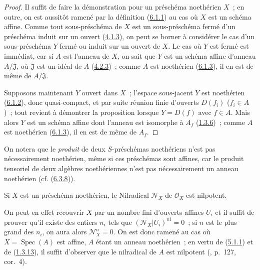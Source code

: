 \begin{proof}
Il suffit de faire la démonstration pour un préschéma noethérien $X$~; en
outre, on est aussitôt ramené par la définition
(\hyperref[I.6.1.1-fr]{6.1.1}) au cas où $X$ est un schéma affine. Comme tout
sous-préschéma de $X$ est un sous-préschéma fermé d'un préschéma induit sur
un ouvert (\hyperref[I.4.1.3-fr]{4.1.3}), on peut se borner à considérer le
cas d'un sous-préschéma $Y$ fermé ou induit sur un ouvert de $X$. Le cas où
$Y$ est fermé est immédiat, car si $A$ est l'anneau de $X$, on sait que $Y$
est un schéma affine d'anneau $A/\mathfrak{J}$, où $\mathfrak{J}$ est un
idéal de $A$ (\hyperref[I.4.2.3-fr]{4.2.3})~; comme $A$ est noethérien
(\hyperref[I.6.1.3-fr]{6.1.3}), il en est de même de $A/\mathfrak{J}$.

Supposons maintenant $Y$ ouvert dans $X$~; l'espace sous-jacent $Y$ est
noethérien (\hyperref[I.6.1.2-fr]{6.1.2}), donc quasi-compact, et par suite
réunion finie d'ouverts $D(f_i)$ ($f_i\in A$)~;
tout revient à démontrer la proposition lorsque $Y=D(f)$ avec $f\in A$. Mais
alors $Y$ est un schéma affine dont l'anneau est isomorphe à $A_f$
(\hyperref[I.1.3.6-fr]{1.3.6})~; comme $A$ est noethérien
(\hyperref[I.6.1.3-fr]{6.1.3}), il en est de même de $A_f$.
\end{proof}

\begin{env}[6.1.5]
\label{I.6.1.5-fr}
On notera que le \emph{produit} de deux $S$-préschémas noethériens n'est pas
nécessairement noethérien, même si ces préschémas sont affines, car le produit
tensoriel de deux algèbres noethériennes n'est pas nécessairement un anneau
noethérien (cf. (\hyperref[I.6.3.8-fr]{6.3.8})).
\end{env}

\begin{proposition}[6.1.6]
\label{I.6.1.6-fr}
Si $X$ est un préschéma noethérien, le Nilradical $\mathscr{N}_X$ de
$\mathscr{O}_X$ est nilpotent.
\end{proposition}

On peut en effet recouvrir $X$ par un nombre fini d'ouverts affines $U_i$ et il
suffit de prouver qu'il existe des entiers $n_i$ tels que
$(\mathscr{N}_X|U_i)^{ni}=0$~; si $n$ est le plus grand des $n_i$, on aura
alors $\mathscr{N}_X^n=0$. On est donc ramené au cas où
$X=\operatorname{Spec}(A)$ est affine, $A$ étant un anneau noethérien~; en
vertu de (\hyperref[I.5.1.1-fr]{5.1.1}) et de
(\hyperref[I.1.3.13-fr]{1.3.13}), il suffit d'observer que le nilradical de
$A$ est nilpotent (\cite{I-11}, p.~127, cor.~4).

